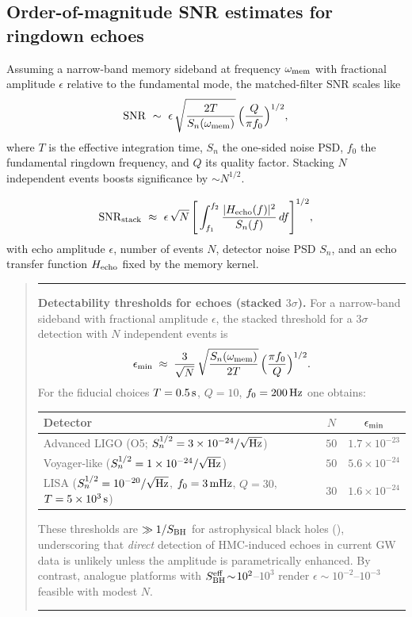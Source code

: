 \documentclass[a4paper,11pt]{article}
\newcommand{\HMC}{\textup{\textsc{HMC}}\xspace}
\newenvironment{infobox}{%
  \par\smallskip\begin{quote}\noindent\hrule\smallskip
}{%
  \smallskip\hrule\end{quote}\smallskip
}
\newenvironment{boxedresult}[1]{\begin{infobox}\noindent\textbf{#1.}}{\end{infobox}}
\theoremstyle{plain}
\theoremstyle{definition}
\theoremstyle{remark}
\begin{document}
\subsection{Order-of-magnitude SNR estimates for ringdown echoes}
\label{sec:snr_estimates}
Assuming a narrow-band memory sideband at frequency $\omega_{\rm mem}$ with fractional amplitude $\epsilon$ relative to the fundamental mode,
the matched-filter SNR scales like
\[
{\rm SNR}\ \sim\ \epsilon\,\sqrt{\frac{2 T}{S_n(\omega_{\rm mem})}}\,\Big(\frac{Q}{\pi f_0}\Big)^{1/2},
\]
where $T$ is the effective integration time, $S_n$ the one-sided noise PSD, $f_0$ the fundamental ringdown frequency, and $Q$ its quality factor.
Stacking $N$ independent events boosts significance by $\sim N^{1/2}$.

\begin{equation}
\label{eq:snr-stack}
\mathrm{SNR}_{\rm stack}\ \approx\ \epsilon\,\sqrt{N}\,\Bigg[\int_{f_1}^{f_2}\frac{|H_{\rm echo}(f)|^2}{S_n(f)}\,df\Bigg]^{1/2},
\end{equation}
with echo amplitude \(\epsilon\), number of events \(N\), detector noise PSD \(S_n\), and an echo transfer function \(H_{\rm echo}\) fixed by the memory kernel.

\begin{boxedresult}{Detectability thresholds for echoes (stacked $3\sigma$)}
For a narrow-band sideband with fractional amplitude $\epsilon$, the stacked threshold for a $3\sigma$ detection with $N$ independent events is
\[
\epsilon_{\rm min} \;\approx\; \frac{3}{\sqrt{N}}\,
\sqrt{\frac{S_n(\omega_{\rm mem})}{2T}}\,
\Big(\frac{\pi f_0}{Q}\Big)^{1/2}.
\]
For the fiducial choices $T=0.5\,{\rm s}$, $Q=10$, $f_0=200\,{\rm Hz}$ one obtains:
\begin{center}
\footnotesize
\setlength{\tabcolsep}{4pt}
\begin{tabularx}{\linewidth}{@{}Y c c@{}}
\toprule
Detector & $N$ & $\epsilon_{\rm min}$ \\
\midrule
Advanced LIGO (O5; $S_n^{1/2}=3\times 10^{-24}/\sqrt{\rm Hz}$) & $50$ & $1.7\times 10^{-23}$ \\
Voyager-like ($S_n^{1/2}=1\times 10^{-24}/\sqrt{\rm Hz}$) & $50$ & $5.6\times 10^{-24}$ \\
\midrule
LISA ($S_n^{1/2}=10^{-20}/\sqrt{\rm Hz}$, $f_0=3\,{\rm mHz}$, $Q=30$, $T=5\times 10^3\,{\rm s}$) & $30$ & $1.6\times 10^{-24}$ \\
\bottomrule
\end{tabularx}
\setlength{\tabcolsep}{6pt}
\end{center}
These thresholds are $\gg 1/S_{\rm BH}$ for astrophysical black holes (), underscoring that \emph{direct} detection of \HMC{}-induced echoes in current GW data is unlikely unless the amplitude is parametrically enhanced. 
By contrast, analogue platforms with $S_{\rm BH}^{\rm eff}\!\sim\!10^2$--$10^3$ render $\epsilon\sim 10^{-2}$--$10^{-3}$ feasible with modest $N$.
\end{boxedresult}
\end{document}

